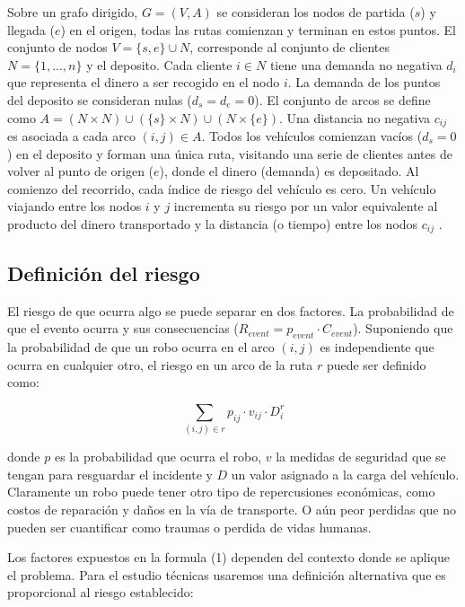 \documentclass[conference]{IEEEtran}
\begin{document}
Sobre un grafo dirigido, $G=(V,A)$ se consideran los nodos de partida ($s$) y llegada ($e$) en el origen, todas las rutas comienzan y terminan en estos puntos. El conjunto de nodos $V=\{s,e\} \cup N$, corresponde al conjunto de clientes $N=\{1,...,n\}$ y el deposito. Cada cliente $i \in N$ tiene una demanda no negativa $d_i$ que representa el dinero a ser recogido en el nodo $i$. La demanda de los puntos del deposito se consideran nulas ($d_s=d_e=0$). El conjunto de arcos se define como $A=(N\times N) \cup (\{s\}\times N) \cup (N\times \{e\})$. Una distancia no negativa $c_{ij}$ es asociada a cada arco $(i,j) \in A$. Todos los vehículos comienzan vacíos ($d_s=0$) en el deposito y forman una única ruta, visitando una serie de clientes antes de volver al punto de origen ($e$), donde el dinero (demanda) es depositado. Al comienzo del recorrido, cada índice de riesgo del vehículo es cero. Un vehículo viajando entre los nodos $i$ y $j$ incrementa su riesgo por un valor equivalente al producto del dinero transportado y la distancia  (o tiempo) entre los nodos $c_{ij}$ \cite{TALARICO2015457} .



\subsection{Definición del riesgo}

El riesgo de que ocurra algo se puede separar en dos factores. La probabilidad de que el evento ocurra y sus consecuencias ($R_{event}=p_{event}\cdot C_{event}$). Suponiendo que la probabilidad de que un robo ocurra en el arco $(i,j)$ es independiente que ocurra en cualquier otro, el riesgo en un arco  de la ruta $r$ puede ser definido como:

\begin{equation}
    \sum_{(i,j)\in r} p_{ij}\cdot v_{ij} \cdot D^r_i
\end{equation}

donde $p$ es la probabilidad que ocurra el robo, $v$ la medidas de seguridad que se tengan para resguardar el incidente y $D$ un valor asignado a la carga del vehículo. Claramente un robo puede tener otro tipo de repercusiones económicas, como costos de reparación y daños en la vía de transporte. O aún peor perdidas que no pueden ser cuantificar como traumas o perdida de vidas humanas. 

Los factores expuestos en la formula (1) dependen del contexto donde se aplique el problema. Para el estudio técnicas usaremos una definición alternativa que es proporcional al riesgo establecido:
\end{document}
